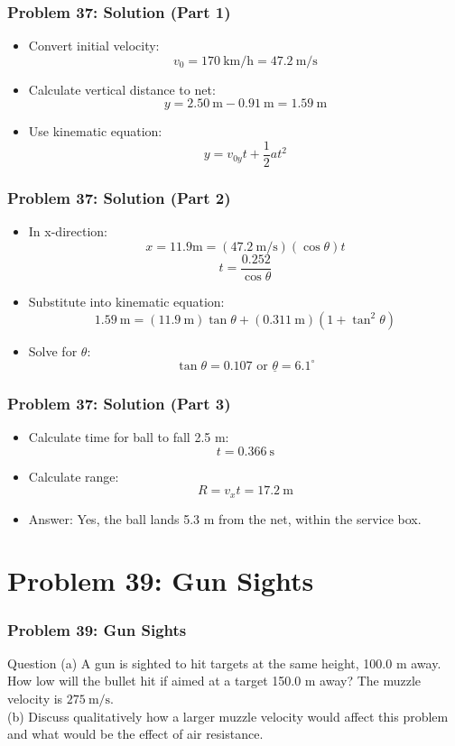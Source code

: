 \documentclass{beamer}
\begin{document}
\begin{frame}
\frametitle{Problem 37: Solution (Part 1)}
\begin{itemize}
    \item Convert initial velocity:
    $$v_{0}=170 \mathrm{~km} / \mathrm{h}=47.2 \mathrm{~m} / \mathrm{s}$$
    \item Calculate vertical distance to net:
    $$y=2.50 \mathrm{~m}-0.91 \mathrm{~m}=1.59 \mathrm{~m}$$
    \item Use kinematic equation:
    $$y=v_{0y} t+\frac{1}{2} a t^{2}$$
\end{itemize}
\end{frame}

\begin{frame}
\frametitle{Problem 37: Solution (Part 2)}
\begin{itemize}
    \item In x-direction:
    $$x=11.9 \mathrm{m}=(47.2 \mathrm{~m} / \mathrm{s})(\cos \theta) t$$
    $$t= \frac{0.252}{\cos \theta}$$
    \item Substitute into kinematic equation:
    $$1.59 \mathrm{~m}=(11.9 \mathrm{~m}) \tan \theta+(0.311 \mathrm{~m})(1+\tan ^{2} \theta)$$
    \item Solve for $\theta$:
    $$\tan \theta=0.107 \text{ or } \underline{\theta}=6.1^{\circ}$$
\end{itemize}
\end{frame}

\begin{frame}

\frametitle{Problem 37: Solution (Part 3)}
\begin{itemize}
    \item Calculate time for ball to fall 2.5 m:
    $$t=0.366 \mathrm{~s}$$
    \item Calculate range:
    $$R=v_{x} t= 17.2 \mathrm{~m}$$
    \item Answer: Yes, the ball lands 5.3 m from the net, within the service box.
\end{itemize}
\end{frame}

\section{Problem 39: Gun Sights}

\begin{frame}
\frametitle{Problem 39: Gun Sights}
\begin{block}{Question}
(a) A gun is sighted to hit targets at the same height, 100.0 m away. How low will the bullet hit if aimed at a target 150.0 m away? The muzzle velocity is $275 \mathrm{~m} / \mathrm{s}$.\\

(b) Discuss qualitatively how a larger muzzle velocity would affect this problem and what would be the effect of air resistance.
\end{block}

\end{frame}
\end{document}

